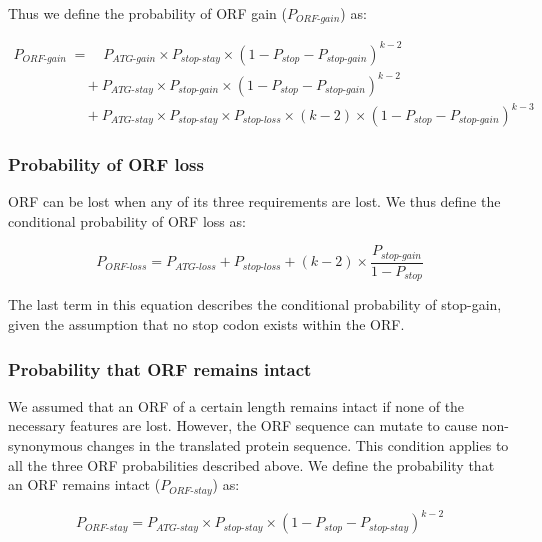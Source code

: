 \documentclass[12pt,a4paper]{article}
\begin{document}
Thus we define the probability of ORF gain ($P_\textit{ORF-gain}$) as:

\begin{align}
P_\textit{ORF-gain} & = \quad P_\textit{ATG-gain}\times P_\textit{stop-stay} \times (1- P_\textit{stop} - P_\textit{stop-gain})^{k-2} \nonumber \\[1pt]
& \quad + P_\textit{ATG-stay}\times P_\textit{stop-gain} \times (1- P_\textit{stop} - P_\textit{stop-gain})^{k-2} \nonumber \\[1pt]
& \quad + P_\textit{ATG-stay}\times P_\textit{stop-stay} \times P_\textit{stop-loss}\times(k-2) \times (1- P_\textit{stop} - P_\textit{stop-gain})^{k-3} 
\label{eqorfgain}
\end{align}

\subsubsection{Probability of ORF loss}

ORF can be lost when any of its three requirements are lost. We thus define the conditional probability of ORF loss as:

\begin{equation}
P_\textit{ORF-loss} = P_\textit{ATG-loss} + P_\textit{stop-loss} + (k-2)\times \frac{P_\textit{stop-gain}}{1-P_\textit{stop}}
\label{eqorfloss}
\end{equation}

The last term in this equation describes the conditional probability of stop-gain, given the assumption that no stop codon exists within the ORF.

\subsubsection{Probability that ORF remains intact}

We assumed that an ORF of a certain length remains intact if none of the necessary features are lost. However, the ORF sequence can mutate to cause non-synonymous changes in the translated protein sequence. This condition applies to all the three ORF probabilities described above. We define the probability that an ORF remains intact ($P_\textit{ORF-stay}$) as:

\begin{equation}
P_\textit{ORF-stay} = P_\textit{ATG-stay} \times P_\textit{stop-stay} \times (1 - P_\textit{stop} - P_\textit{stop-stay})^{k-2}
\label{eqorfstay}
\end{equation}
\end{document}
